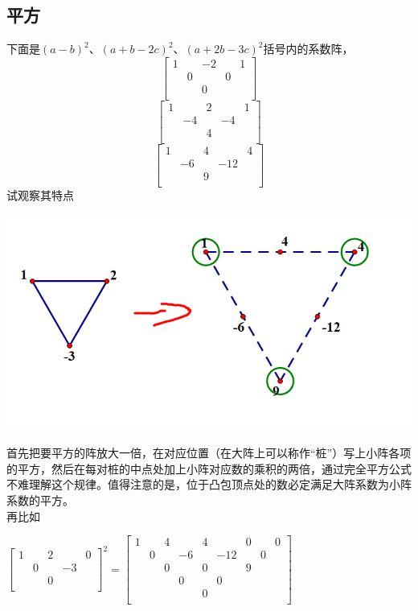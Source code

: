 \documentclass[UTF8]{ctexart}
\begin{document}
\subsection{平方}
下面是$ (a-b)^{2} $、$ (a+b-2c)^{2} $、$ (a+2b-3c)^{2} $括号内的系数阵，
\renewcommand*{\arraystretch}{1.732}\[\left[\begin{matrix}
	1& &-2& &1\\
	&0& &0&\\
	& &0& &\\
\end{matrix}\right]\]
\renewcommand*{\arraystretch}{1.732}\[\left[\begin{matrix}
	1& &2& &1\\
	&-4& &-4&\\
	& &4& &\\
\end{matrix}\right]\]
\renewcommand*{\arraystretch}{1.732}\[\left[\begin{matrix}
	1& &4& &4\\
	&-6& &-12&\\
	& &9& &\\
\end{matrix}\right]\]
试观察其特点
\begin{center}
	\includegraphics[width=0.5\linewidth]{260}
\end{center}
首先把要平方的阵放大一倍，在对应位置（在大阵上可以称作“桩”）写上小阵各项的平方，然后在每对桩的中点处加上小阵对应数的乘积的两倍，通过完全平方公式不难理解这个规律。值得注意的是，位于凸包顶点处的数必定满足大阵系数为小阵系数的平方。\\
再比如\\
\begin{center}
	$ \left[\begin{matrix}
	1& &2& &0\\
	&0& &-3&\\
	& &0& &\\
\end{matrix}\right]^{2} =
\left[\begin{matrix}
1& &4& &4& &0& &0\\
&0& &-6& &-12& &0&\\
& &0& &0& &9& &\\
& & &0& &0& & &\\
& & & &0& & & &\\
\end{matrix}\right]$
\end{center}
\end{document}
